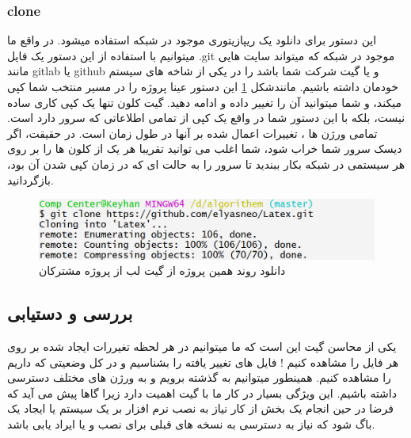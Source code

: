 \subsubsection{clone}
این دستور برای دانلود یک ریپازیتوری موجود در شبکه استفاده میشود. در واقع ما میتوانیم با استفاده از این دستور یک فایل .git موجود در شبکه که میتواند سایت هایی مانند gitlab یا github و یا گیت شرکت شما باشد را در یکی از شاخه های سیستم خودمان داشته باشیم. مانندشکل \ref{Fig:GitClone}    \newline این دستور عینا پروژه را در مسیر منتخب شما کپی میکند، و شما میتوانید آن را تغییر داده و ادامه دهید. \newline گیت کلون تنها یک کپی کاری ساده نیست، بلکه با این دستور شما در واقع یک کپی از تمامی اطلاعاتی که سرور دارد است. تمامی ورژن ها ، تغییرات اعمال شده بر آنها در طول زمان است. \newline در حقیقت، اگر دیسک سرور شما خراب شود، شما اغلب می توانید تقریبا هر یک از کلون ها را بر روی هر سیستمی در شبکه بکار ببندید تا سرور را به حالت ای که در زمان کپی شدن آن بود، بازگردانید.  
\newline
\newline
\begin{figure}[tbh]
	\centering
	\includegraphics[width=1\textwidth]{./Figures/GitClone}
	\caption{ دانلود روند همین پروژه از گیت لب از پروژه مشترکان   }
	\label{Fig:GitClone}
\end{figure}
\subsection{بررسی و دستیابی}
یکی از محاسن گیت این است که ما میتوانیم در هر لحظه تغیررات ایجاد شده بر روی هر فایل را مشاهده کنیم ! فایل های تغییر یافته را بشناسیم و در کل وضعیتی که داریم را مشاهده کنیم. همینطور میتوانیم به گذشته برویم و به ورژن های مختلف دسترسی داشته باشیم.
این ویژگی بسیار در کار ما با گیت اهمیت دارد زیرا گاها پیش می آید که فرضا در حین انجام یک بخش از کار نیاز به نصب نرم افزار بر یک سیستم یا ایجاد یک باگ شود که نیاز به دسترسی به نسخه های قبلی برای نصب و یا ایراد یابی باشد. 
